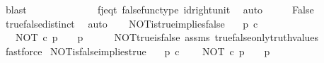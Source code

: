 \begin{isabellebody}
\ blast\isanewline
\ \ \isamarkupfalse%
\ \isamarkupfalse%
\ {\isachardoublequoteopen}{\isasymf}\ {\isacharequal}{\kern0pt}\ {\isasymt}{\isachardoublequoteclose}\isanewline
\ \ \ \ \isamarkupfalse%
\ f{\isacharunderscore}{\kern0pt}j{\isacharunderscore}{\kern0pt}eq{\isacharunderscore}{\kern0pt}t\ false{\isacharunderscore}{\kern0pt}func{\isacharunderscore}{\kern0pt}type\ id{\isacharunderscore}{\kern0pt}right{\isacharunderscore}{\kern0pt}unit{}\ \isamarkupfalse%
\ auto\isanewline
\ \ \isamarkupfalse%
\ \isamarkupfalse%
\ False\isanewline
\ \ \ \ \isamarkupfalse%
\ true{\isacharunderscore}{\kern0pt}false{\isacharunderscore}{\kern0pt}distinct\ \isamarkupfalse%
\ auto\isanewline
{}\isamarkupfalse%
%
\endisatagproof
{\isafoldproof}%
%
\isadelimproof
\isanewline
%
\endisadelimproof
\ \ \isanewline
{}\isamarkupfalse%
\ NOT{\isacharunderscore}{\kern0pt}is{\isacharunderscore}{\kern0pt}true{\isacharunderscore}{\kern0pt}implies{\isacharunderscore}{\kern0pt}false{\isacharcolon}{\kern0pt}\isanewline
\ \ \ {\isachardoublequoteopen}p\ {\isasymin}\isactrlsub c\ {\isasymOmega}{\isachardoublequoteclose}\isanewline
\ \ \ {\isachardoublequoteopen}NOT\ {\isasymcirc}\isactrlsub c\ p\ {\isacharequal}{\kern0pt}\ {\isasymt}\ {\isasymLongrightarrow}\ p\ {\isacharequal}{\kern0pt}\ {\isasymf}{\isachardoublequoteclose}\isanewline
%
\isadelimproof
\ \ %
\endisadelimproof
%
\isatagproof
{}\isamarkupfalse%
\ NOT{\isacharunderscore}{\kern0pt}true{\isacharunderscore}{\kern0pt}is{\isacharunderscore}{\kern0pt}false\ assms\ true{\isacharunderscore}{\kern0pt}false{\isacharunderscore}{\kern0pt}only{\isacharunderscore}{\kern0pt}truth{\isacharunderscore}{\kern0pt}values\ \isamarkupfalse%
\ fastforce%
\endisatagproof
{\isafoldproof}%
%
\isadelimproof
\isanewline
%
\endisadelimproof
\isanewline
{}\isamarkupfalse%
\ NOT{\isacharunderscore}{\kern0pt}is{\isacharunderscore}{\kern0pt}false{\isacharunderscore}{\kern0pt}implies{\isacharunderscore}{\kern0pt}true{\isacharcolon}{\kern0pt}\isanewline
\ \ \ {\isachardoublequoteopen}p\ {\isasymin}\isactrlsub c\ {\isasymOmega}{\isachardoublequoteclose}\isanewline
\ \ \ {\isachardoublequoteopen}NOT\ {\isasymcirc}\isactrlsub c\ p\ {\isacharequal}{\kern0pt}\ {\isasymf}\ {\isasymLongrightarrow}\ p\ {\isacharequal}{\kern0pt}\ {\isasymt}{\isachardoublequoteclose}\isanewline

\end{isabellebody}
